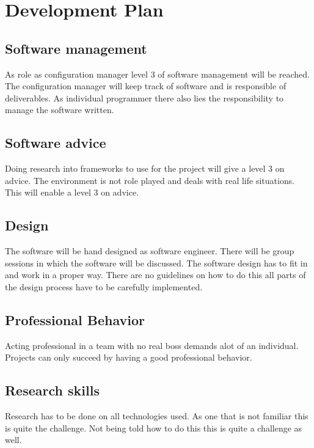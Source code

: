 \newpage
\section{Development Plan}
\label{sec:development}

\subsection{Software management}
As role as configuration manager level 3 of software management will be reached. The configuration manager will keep track of software and is responsible of deliverables. As individual programmer there also lies the responsibility to manage the software written.

\subsection{Software advice}
Doing research into frameworks to use for the project will give a level 3 on advice. The environment is not role played and deals with real life situations. This will enable a level 3 on advice.

\subsection{Design}
The software will be hand designed as software engineer. There will be group sessions in which the software will be discussed. The software design has to fit in and work in a proper way. There are no guidelines on how to do this all parts of the design process have to be carefully implemented.

\subsection{Professional Behavior}
Acting professional in a team with no real boss demands alot of an individual. Projects can only succeed by having a good professional behavior.

\subsection{Research skills}
Research has to be done on all technologies used. As one that is not familiar this is quite the challenge. Not being told how to do this this is quite a challenge as well.

